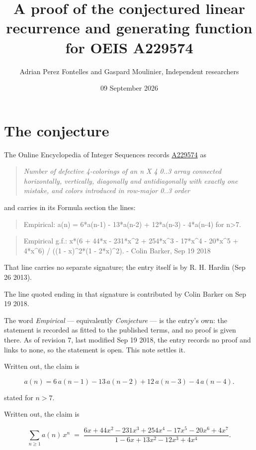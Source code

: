 \documentclass[11pt]{article}
\title{A proof of the conjectured linear recurrence and generating function for OEIS A229574}
\author{Adrian Perez Fontelles and Gaspard Moulinier, Independent researchers}
\date{09 September 2026}
\theoremstyle{definition}
\begin{document}
\maketitle
\section{The conjecture}

The Online Encyclopedia of Integer Sequences records \href{https://oeis.org/A229574}{A229574} as

\begin{quote}\itshape Number of defective 4-colorings of an n X 4 0..3 array connected horizontally, vertically, diagonally and antidiagonally with exactly one mistake, and colors introduced in row-major 0..3 order\end{quote}

and carries in its Formula section the lines:

\begin{quote}\ttfamily Empirical: a(n) = 6*a(n-1) - 13*a(n-2) + 12*a(n-3) - 4*a(n-4) for n>7.\end{quote}

\begin{quote}\ttfamily Empirical g.f.: x*(6 + 44*x - 231*x\textasciicircum{}2 + 254*x\textasciicircum{}3 - 17*x\textasciicircum{}4 - 20*x\textasciicircum{}5 + 4*x\textasciicircum{}6) / ((1 - x)\textasciicircum{}2*(1 - 2*x)\textasciicircum{}2). - Colin Barker, Sep 19 2018\end{quote}

That line carries no separate signature; the entry itself is by R. H. Hardin (Sep 26 2013).

The line quoted ending in that signature is contributed by Colin Barker on Sep 19 2018.

The word {\itshape Empirical} --- equivalently {\itshape Conjecture} --- is the entry's own: the statement is recorded as fitted to the published terms, and no proof is given there. As of revision 7, last modified Sep 19 2018, the entry records no proof and links to none, so the statement is open. This note settles it.

Written out, the claim is

\[a(n) = 6\,a(n-1) - 13\,a(n-2) + 12\,a(n-3) - 4\,a(n-4).\]

stated for $n > 7$.

Written out, the claim is

\[\sum_{n \ge 1} a(n)\,x^n \;=\; \frac{6x + 44x^{2} - 231x^{3} + 254x^{4} - 17x^{5} - 20x^{6} + 4x^{7}}{1 - 6x + 13x^{2} - 12x^{3} + 4x^{4}}.\]
\end{document}
